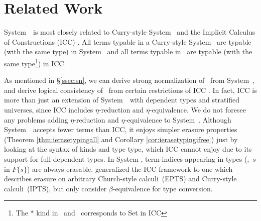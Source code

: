 \section{Related Work} \label{sec:relwork}
System~\Fi\ is most closely related to
Curry-style System~\Fw \cite{AbeMatUus05,GHR93}
and the Implicit Calculus of Constructions (ICC) \cite{Miquel01}.
All terms typable in a Curry-style System \Fw\ are typable (with the same type) in System \Fi\ 
and all terms typable in \Fi\ are typable (with the same type\footnote{The $*$ kind in \Fw\ and \Fi\ corresponds
	to \textsf{Set} in ICC}) in ICC.

As mentioned in \S\ref{ssec:sn}, we can derive strong normalization of \Fi\ 
from System~\Fw, and derive logical consistency of \Fi\ from certain
restrictions of ICC \cite{Miquel00,BarrasB08}.
In fact, ICC is more than just an extension of System~\Fi\ 
with dependent types and stratified universes, since ICC includes
$\eta$-reduction and $\eta$-equivalence.
We do not foresee any problems adding
$\eta$-reduction and $\eta$-equivalence to System~\Fi.
Although System~\Fi\ accepts fewer terms than ICC, it enjoys simpler
erasure properties (Theorem \ref{thm:ierasetypingall} and
Corollary \ref{cor:ierasetypingifree}) just by looking at the syntax
of kinds and type type, which ICC cannot enjoy due to its support for
full dependent types.  In System \Fi, term-indices appearing in types
(\eg,~$s$ in $F\{s\}$) are always erasable.  \citet{LingerS08} generalized the ICC framework to one which describes
erasure on arbitrary Church-style calculi~(EPTS) and Curry-style
calculi~(IPTS), but only consider $\beta$-equivalence for type conversion.


